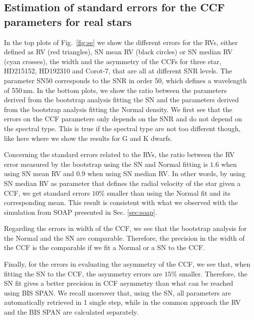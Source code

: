 \documentclass[11pt, oneside]{article}
\begin{document}
\subsection{Estimation of standard errors for the CCF parameters for real stars} \label{sec:bootstrap_real_star}
In the top plots of Fig.~\ref{fig:se} we show the different errors for the RVs, either defined as RV (red triangles), SN mean RV (black circles) or SN median RV (cyan crosses), the width and the asymmetry of the CCFs for three star, HD215152, HD192310 and Corot-7, that are all at different SNR levels. The parameter SN50 corresponds to the SNR in order 50, which defines a wavelength of 550\,nm. In the bottom plots, we show the ratio between the parameters derived from the bootstrap analysis fitting the SN and the parameters derived from the bootstrap analysis fitting the Normal density. We first see that the errors on the CCF parameters only depends on the SNR and do not depend on the spectral type. This is true if the spectral type are not too different though, like here where we show the results for G and K dwarfs.

Concerning the standard errors related to the RVs, the ratio between the RV error measured by the bootstrap using the SN and Normal fitting is $1.6$ when using SN mean RV and $0.9$ when using SN median RV. In other words, by using SN median RV as parameter that defines the radial velocity of the star given a CCF, we get standard errors $10\%$ smaller than using the Normal fit and its corresponding mean. This result is consistent with what we observed with the simulation from SOAP presented in Sec. \ref{sec:soap}.

Regarding the errors in width of the CCF, we see that the bootstrap analysis for the Normal and the SN are comparable. Therefore, the precision in the width of the CCF is the comparable if we fit a Normal or a SN to the CCF.

Finally, for the errors in evaluating the asymmetry of the CCF, we see that, when fitting the SN to the CCF, the asymmetry errors are $15\%$ smaller. Therefore, the SN fit gives a better precision in CCF asymmetry than what can be reached using BIS SPAN. We recall moreover that, using the SN, all parameters are automatically retrieved in 1 single step, while in the common approach the RV and the BIS SPAN are calculated separately.
\end{document}
